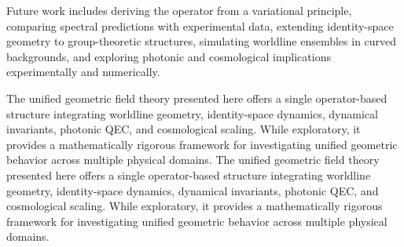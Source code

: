 \documentclass[aip,jmp,reprint,onecolumn,nofootinbib]{revtex4-2}
\begin{document}
Future work includes deriving the operator from a variational principle, comparing spectral 
predictions with experimental data, extending identity-space geometry to group-theoretic 
structures, simulating worldline ensembles in curved backgrounds, and exploring photonic 
and cosmological implications experimentally and numerically.

The unified geometric field theory presented here offers a single operator-based structure 
integrating worldline geometry, identity-space dynamics, dynamical invariants, photonic 
QEC, and cosmological scaling. While exploratory, it provides a mathematically rigorous 
framework for investigating unified geometric behavior across multiple physical domains.
The unified geometric field theory presented here offers a single operator-based structure 
integrating worldline geometry, identity-space dynamics, dynamical invariants, photonic 
QEC, and cosmological scaling. While exploratory, it provides a mathematically rigorous 
framework for investigating unified geometric behavior across multiple physical domains.



\end{document}
